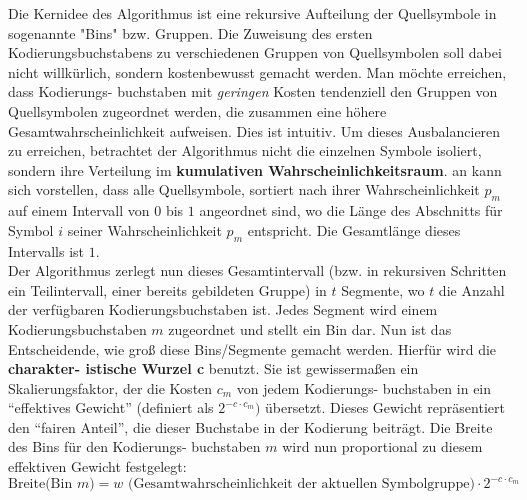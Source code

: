 \documentclass[a4paper,10pt,ngerman]{scrartcl}
\begin{document}
Die Kernidee des Algorithmus ist eine rekursive Aufteilung der Quellsymbole in sogenannte "Bins" bzw. Gruppen. Die Zuweisung des ersten Kodierungsbuchstabens zu verschiedenen Gruppen von Quellsymbolen soll dabei nicht willkürlich, sondern kostenbewusst gemacht werden. Man möchte erreichen, dass Kodierungs- buchstaben mit \textit{geringen} Kosten tendenziell den Gruppen von Quellsymbolen zugeordnet werden, die zusammen eine höhere Gesamtwahrscheinlichkeit aufweisen. Dies ist intuitiv. 
\newline
Um dieses Ausbalancieren zu erreichen, betrachtet der Algorithmus nicht die einzelnen Symbole isoliert, sondern ihre Verteilung im \textbf{kumulativen Wahrscheinlichkeitsraum}. an kann sich vorstellen, dass alle Quellsymbole, sortiert nach ihrer Wahrscheinlichkeit $p_{m}$ auf einem Intervall von $0$ bis $1$ angeordnet sind, wo die Länge des Abschnitts für Symbol $i$ seiner Wahrscheinlichkeit $p_{m}$ entspricht. Die Gesamtlänge dieses Intervalls ist $1$. \\
\newline
Der Algorithmus zerlegt nun dieses Gesamtintervall (bzw. in rekursiven Schritten ein Teilintervall, einer bereits gebildeten Gruppe) in $t$ Segmente, wo $t$ die Anzahl der verfügbaren Kodierungsbuchstaben ist. Jedes Segment wird einem Kodierungsbuchstaben $m$ zugeordnet und stellt ein Bin dar.
\newline
Nun ist das Entscheidende, wie groß diese Bins/Segmente gemacht werden. Hierfür wird die \textbf{charakter- istische Wurzel c} benutzt. Sie ist gewissermaßen ein Skalierungsfaktor, der die Kosten $c_{m}$ von jedem Kodierungs- buchstaben in ein “effektives Gewicht” (definiert als $2^{-c\cdot c_{m}})$ übersetzt. Dieses Gewicht repräsentiert den “fairen Anteil”, die dieser Buchstabe in der Kodierung beiträgt. Die Breite des Bins für den Kodierungs- buchstaben $m$ wird nun proportional zu diesem effektiven Gewicht festgelegt: \\
\newline
\begin{equation}
  \text{Breite(Bin } m \text{)} = w \text{ (Gesamtwahrscheinlichkeit der aktuellen Symbolgruppe)} \cdot 2^{-c \cdot c_{m}}
\end{equation}
\end{document}
